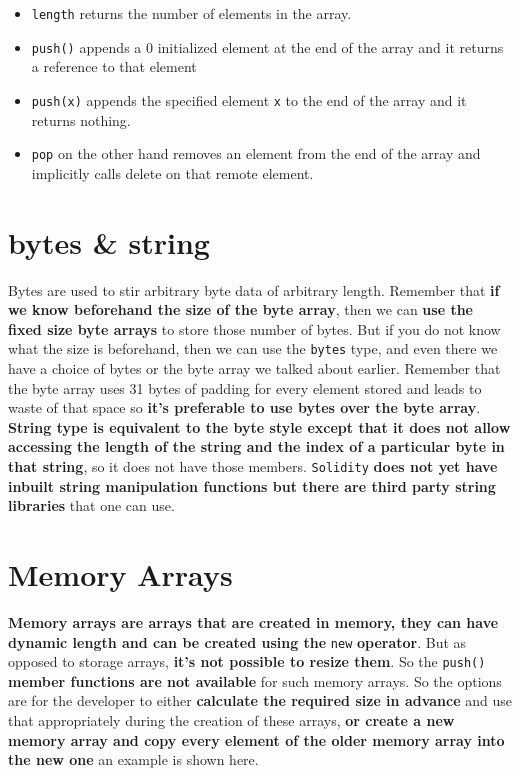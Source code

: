 \begin{itemize}
\item\texttt{length} returns the number of elements in the array.
\item\texttt{push()} appends a 0 initialized element at the end of the array and it returns a reference to that element
\item\texttt{push(x)} appends the specified element \texttt{x} to the end of the array and it returns nothing.
\item\texttt{pop} on the other hand removes an element from the end of the array and implicitly calls delete on that remote element.
\end{itemize}

\section{bytes \& string}

Bytes are used to stir arbitrary byte data of arbitrary length. Remember that \textbf{if we know beforehand the size of the byte array}, then we can \textbf{use the fixed size byte arrays} to store those number of bytes. But if you do not know what the size is beforehand, then we can use the \texttt{bytes} type, and even there we have a choice of bytes or the byte array we talked about earlier. Remember that the byte array uses 31 bytes of padding for every element stored and leads to waste of that space so \textbf{it's preferable to use bytes over the byte array}.\\

\textbf{String type is equivalent to the byte style except that it does not allow accessing the length of the string and the index of a particular byte in that string}, so it does not have those members. \texttt{Solidity} \textbf{does not yet have inbuilt string manipulation functions but there are third party string libraries} that one can use.

\section{Memory Arrays}
\textbf{Memory arrays are arrays that are created in memory, they can have dynamic length and can be created using the} \texttt{new} \textbf{operator}. But as opposed to storage arrays, \textbf{it's not possible to resize them}. So the \texttt{push()} \textbf{member functions are not available} for such memory arrays. So the options are for the developer to either \textbf{calculate the required size in advance} and use that appropriately during the creation of these arrays, \textbf{or create a new memory array and copy every element of the older memory array into the new one} an example is shown here.

